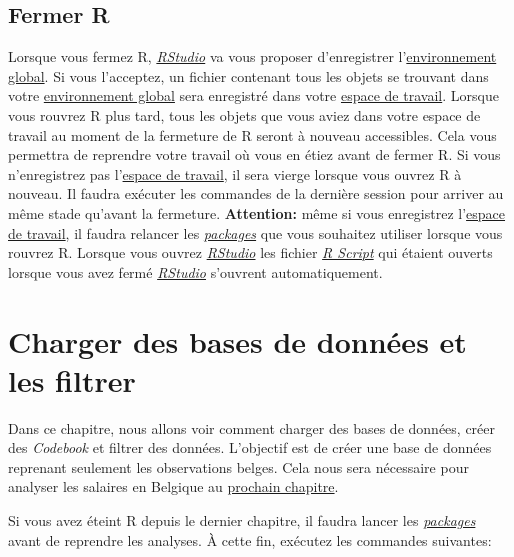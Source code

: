 \documentclass[
]{book}
\begin{document}
\hypertarget{close_R}{%
\section{Fermer R}\label{close_R}}

Lorsque vous fermez R, \href{https://posit.co/}{\emph{RStudio}} va vous proposer d'enregistrer l'\protect\hyperlink{objets_envir}{environnement global}. Si vous l'acceptez, un fichier contenant tous les objets se trouvant dans votre \protect\hyperlink{objets_envir}{environnement global} sera enregistré dans votre \protect\hyperlink{working_directory}{espace de travail}. Lorsque vous rouvrez R plus tard, tous les objets que vous aviez dans votre espace de travail au moment de la fermeture de R seront à nouveau accessibles. Cela vous permettra de reprendre votre travail où vous en étiez avant de fermer R. Si vous n'enregistrez pas l'\protect\hyperlink{working_directory}{espace de travail}, il sera vierge lorsque vous ouvrez R à nouveau. Il faudra exécuter les commandes de la dernière session pour arriver au même stade qu'avant la fermeture. \textbf{Attention:} même si vous enregistrez l'\protect\hyperlink{working_directory}{espace de travail}, il faudra relancer les \protect\hyperlink{packages}{\emph{packages}} que vous souhaitez utiliser lorsque vous rouvrez R. Lorsque vous ouvrez \href{https://posit.co/}{\emph{RStudio}} les fichier \protect\hyperlink{Commandes}{\emph{R Script}} qui étaient ouverts lorsque vous avez fermé \href{https://posit.co/}{\emph{RStudio}} s'ouvrent automatiquement.

\hypertarget{charge_code_filtrer}{%
\chapter{Charger des bases de données et les filtrer}\label{charge_code_filtrer}}

Dans ce chapitre, nous allons voir comment charger des bases de données, créer des \emph{Codebook} et filtrer des données. L'objectif est de créer une base de données reprenant seulement les observations belges. Cela nous sera nécessaire pour analyser les salaires en Belgique au \protect\hyperlink{salaire_belge_stat_desc}{prochain chapitre}.

Si vous avez éteint R depuis le dernier chapitre, il faudra lancer les \protect\hyperlink{packages}{\emph{packages}} avant de reprendre les analyses. À cette fin, exécutez les commandes suivantes:
\end{document}
